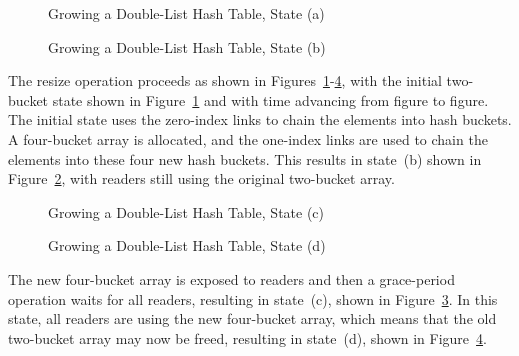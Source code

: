 \begin{figure}[tb]
\centering
{}
\caption{Growing a Double-List Hash Table, State (a)}
\label{fig:datastruct:Growing a Double-List Hash Table, State (a)}
\end{figure}

\begin{figure}[tb]
\centering
{}
\caption{Growing a Double-List Hash Table, State (b)}
\label{fig:datastruct:Growing a Double-List Hash Table, State (b)}
\end{figure}

The resize operation proceeds as shown in
Figures~\ref{fig:datastruct:Growing a Double-List Hash Table, State (a)}-\ref{fig:datastruct:Growing a Double-List Hash Table, State (d)},
with the initial two-bucket state shown in
Figure~\ref{fig:datastruct:Growing a Double-List Hash Table, State (a)}
and with time advancing from figure to figure.
The initial state uses the zero-index links to chain the elements into
hash buckets.
A four-bucket array is allocated, and the one-index links are used to
chain the elements into these four new hash buckets.
This results in state~(b) shown in
Figure~\ref{fig:datastruct:Growing a Double-List Hash Table, State (b)},
with readers still using the original two-bucket array.

\begin{figure}[tb]
\centering
{}
\caption{Growing a Double-List Hash Table, State (c)}
\label{fig:datastruct:Growing a Double-List Hash Table, State (c)}
\end{figure}

\begin{figure}[tb]
\centering
{}
\caption{Growing a Double-List Hash Table, State (d)}
\label{fig:datastruct:Growing a Double-List Hash Table, State (d)}
\end{figure}

The new four-bucket array is exposed to readers and then a grace-period
operation waits for all readers, resulting in state~(c), shown in
Figure~\ref{fig:datastruct:Growing a Double-List Hash Table, State (c)}.
In this state, all readers are using the new four-bucket array,
which means that the old two-bucket array may now be freed, resulting
in state~(d), shown in
Figure~\ref{fig:datastruct:Growing a Double-List Hash Table, State (d)}.

